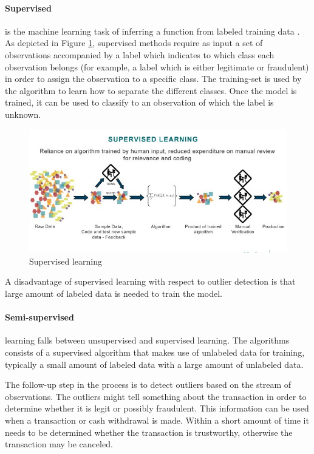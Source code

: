 \paragraph{Supervised} is the machine learning task of inferring a function from labeled training data \cite{9780262018258}. As depicted in Figure \ref{fig:supervised}, supervised methods require as input a set of observations accompanied by a label which indicates to which class each observation belongs (for example, a label which is either legitimate or fraudulent) in order to assign the observation to a specific class. The training-set is used by the algorithm to learn how to separate the different classes. Once the model is trained, it can be used to classify to an observation of which the label is unknown.
\begin{figure}[ht!]
\centering
\includegraphics[width=\textwidth]{figures/supervised.jpg}
\caption{Supervised learning}
\label{fig:supervised}
\end{figure}
A disadvantage of supervised learning with respect to outlier detection is that large amount of labeled data is needed to train the model. 

\paragraph{Semi-supervised} learning falls between unsupervised and supervised learning. The algorithms consists of a supervised algorithm that makes use of unlabeled data for training, typically a small amount of labeled data with a large amount of unlabeled data.

The follow-up step in the process is to detect outliers based on the stream of observations. The outliers might tell something about the transaction in order to determine whether it is legit or possibly fraudulent. This information can be used when a transaction or cash withdrawal is made. Within a short amount of time it needs to be determined whether the transaction is trustworthy, otherwise the transaction may be canceled.

